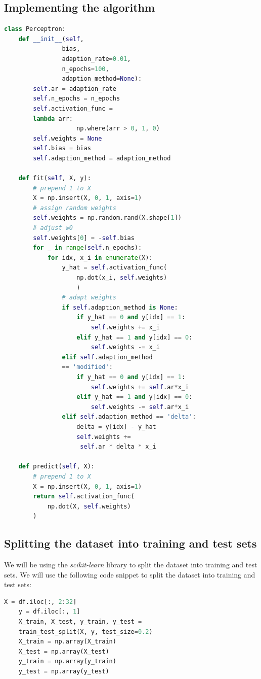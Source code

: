 \subsection{Implementing the algorithm}
\begin{lstlisting}[language=Python]
class Perceptron:
    def __init__(self, 
                bias, 
                adaption_rate=0.01, 
                n_epochs=100, 
                adaption_method=None):
        self.ar = adaption_rate
        self.n_epochs = n_epochs
        self.activation_func = 
        lambda arr: 
                    np.where(arr > 0, 1, 0)
        self.weights = None
        self.bias = bias
        self.adaption_method = adaption_method

    def fit(self, X, y):
        # prepend 1 to X
        X = np.insert(X, 0, 1, axis=1)
        # assign random weights
        self.weights = np.random.rand(X.shape[1])
        # adjust w0
        self.weights[0] = -self.bias
        for _ in range(self.n_epochs):
            for idx, x_i in enumerate(X):
                y_hat = self.activation_func(
                    np.dot(x_i, self.weights)
                    )
                # adapt weights
                if self.adaption_method is None:
                    if y_hat == 0 and y[idx] == 1:
                        self.weights += x_i
                    elif y_hat == 1 and y[idx] == 0:
                        self.weights -= x_i
                elif self.adaption_method 
                == 'modified':
                    if y_hat == 0 and y[idx] == 1:
                        self.weights += self.ar*x_i
                    elif y_hat == 1 and y[idx] == 0:
                        self.weights -= self.ar*x_i
                elif self.adaption_method == 'delta':
                    delta = y[idx] - y_hat
                    self.weights +=
                     self.ar * delta * x_i

    def predict(self, X):
        # prepend 1 to X
        X = np.insert(X, 0, 1, axis=1)
        return self.activation_func(
            np.dot(X, self.weights)
        )
\end{lstlisting}
\subsection{Splitting the dataset into training and test sets}
We will be using the \textit{scikit-learn} library to split the dataset into training and test sets. We will use the following code snippet to split the dataset into training and test sets:
\begin{lstlisting}[language=Python]
    X = df.iloc[:, 2:32]
    y = df.iloc[:, 1]
    X_train, X_test, y_train, y_test = 
    train_test_split(X, y, test_size=0.2)
    X_train = np.array(X_train)
    X_test = np.array(X_test)
    y_train = np.array(y_train)
    y_test = np.array(y_test)
\end{lstlisting}

